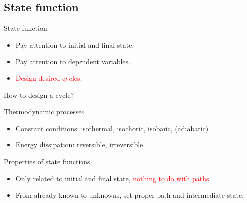 \documentclass[12pt,compress]{beamer}
\begin{document}
\subsection{State function}
\begin{frame}{State function}
    \begin{itemize}
        \item Pay attention to initial and final state.
        \item Pay attention to dependent variables.
        \item \textcolor{red}{Design desired cycles.}
    \end{itemize}
\end{frame}
\begin{frame}{How to design a cycle?}
    \begin{block}{Thermodynamic processes}
        \begin{itemize}
            \item Constant conditions: isothermal, isochoric, isobaric, (adiabatic)
            \item Energy dissipation: reversible, irreversible
        \end{itemize}
    \end{block}
    \begin{block}{Properties of state functions}
        \begin{itemize}
            \item Only related to initial and final state, \textcolor{red}{nothing to do with paths}.
            \item From already known to unknowns, set proper path and intermediate state.
        \end{itemize}
    \end{block}
\end{frame}
\end{document}
